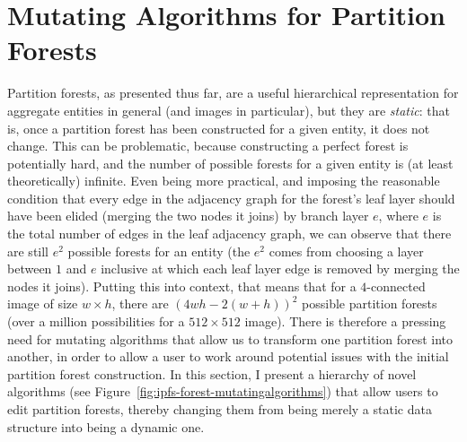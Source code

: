 \newpage

\section{Mutating Algorithms for Partition Forests}
\label{sec:ipfs-mutatingalgorithms}


Partition forests, as presented thus far, are a useful hierarchical representation for aggregate entities in general (and images in particular), but they are \emph{static}: that is, once a partition forest has been constructed for a given entity, it does not change. This can be problematic, because constructing a perfect forest is potentially hard, and the number of possible forests for a given entity is (at least theoretically) infinite. Even being more practical, and imposing the reasonable condition that every edge in the adjacency graph for the forest's leaf layer should have been elided (merging the two nodes it joins) by branch layer $e$, where $e$ is the total number of edges in the leaf adjacency graph, we can observe that there are still $e^2$ possible forests for an entity (the $e^2$ comes from choosing a layer between $1$ and $e$ inclusive at which each leaf layer edge is removed by merging the nodes it joins). Putting this into context, that means that for a $4$-connected image of size $w \times h$, there are $(4wh - 2(w+h))^2$ possible partition forests (over a million possibilities for a $512 \times 512$ image). There is therefore a pressing need for mutating algorithms that allow us to transform one partition forest into another, in order to allow a user to work around potential issues with the initial partition forest construction. In this section, I present a hierarchy of novel algorithms (see Figure~\ref{fig:ipfs-forest-mutatingalgorithms}) that allow users to edit partition forests, thereby changing them from being merely a static data structure into being a dynamic one.


\vspace{-\baselineskip}


